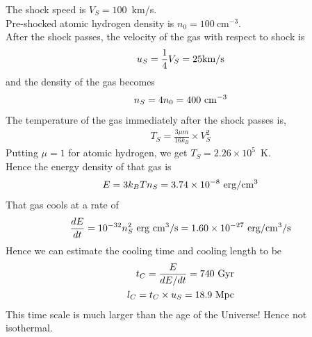 \documentclass{jhwhw}
\begin{document}






\solution
The shock speed is $V_S = 100$~km/s.\\
Pre-shocked atomic hydrogen density is $n_0 = 100 ~$cm$^{-3}$.\\
After the shock passes, the velocity of the gas with respect to shock is
\begin{align}
u_S = \frac{1}{4} V_S = 25 \rm{km/s}
\end{align} 
and the density of the gas becomes
\begin{align}
n_S = 4 {n_0} = 400 ~\rm{cm^{-3}}
\end{align}
%
The temperature of the gas immediately after the shock passes is,
\begin{align}
T_S = \frac{3 \mu m}{16 k_B} \times V_S^2
\end{align}
Putting $\mu = 1$ for atomic hydrogen, we get $T_S = 2.26 \times 10^5$~K.\\
Hence the energy density of that gas is
\begin{align}
E = 3 k_B T n_S = 3.74 \times 10^{-8} \rm{~erg /cm^3}
\end{align}
That gas cools at a rate of
\begin{align}
\frac{dE}{dt} = 10^{-32} n_S^2 \rm{~erg ~cm^3/s} = 1.60 \times 10^{-27} \rm{~erg /cm^3/s}
\end{align}
Hence we can estimate the cooling time and cooling length to be
\begin{align}
t_C = \dfrac{E}{{dE}/{dt}} = 740 ~\rm{Gyr}\\
l_C = t_C \times u_S = 18.9 ~\rm{Mpc}
\end{align}
This time scale is much larger than the age of the Universe! Hence not isothermal. 

















\end{document}

